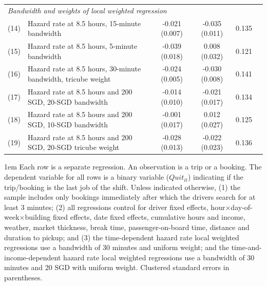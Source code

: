 \documentclass[reviewmode,AEJ]{AEA}
\begin{document}
\begin{appendices}
\begin{table}[]
\begin{tabularx}{\textwidth}{ll@{\extracolsep{\fill}}*{4}{c}}
    	\midrule
    	\multicolumn{5}{l}{\textit{Bandwidth and weights of local weighted regression}} \\
    	(14) & Hazard rate at 8.5 hours, 15-minute bandwidth & -0.021\sym{**} (0.007) & -0.035\sym{**} (0.011) & 0.135 \\
    	(15) & Hazard rate at 8.5 hours, 5-minute bandwidth & -0.039\sym{*} (0.018) & 0.008 (0.032) & 0.121 \\
    	(16) & Hazard rate at 8.5 hours, 30-minute bandwidth, tricube weight & -0.024\sym{***} (0.005) & -0.030\sym{***} (0.008) & 0.141 \\
    	(17) & Hazard rate at 8.5 hours and 200 SGD, 20-SGD bandwidth & -0.014 (0.010) & -0.021 (0.017) & 0.134 \\
    	(18) & Hazard rate at 8.5 hours and 200 SGD, 10-SGD bandwidth & -0.001 (0.017) & 0.012 (0.027) & 0.125 \\
    	(19) & Hazard rate at 8.5 hours and 200 SGD, 20-SGD tricube weight & -0.028\sym{*} (0.013) & -0.022 (0.023) & 0.136 \\
    	\bottomrule
    \end{tabularx}%
    \label{tb:immepickup}
	\begin{tablenotes}
		\parindent 1em%
		\small
	    Each row is a separate regression. An observation is a trip or a booking. The dependent variable for all rows is a binary variable ($Quit_{it}$) indicating if the trip/booking is the last job of the shift. Unless indicated otherwise, (1) the sample includes only bookings immediately after which the drivers search for at least 3 minutes; (2) all regressions control for driver fixed effects, hour\(\times\)day-of-week\(\times\)building fixed effects, date fixed effects,  cumulative hours and income, weather, market thickness, break time, passenger-on-board time, distance and duration to pickup; and (3) the time-dependent hazard rate local weighted regressions use a bandwidth of 30 minutes and uniform weight; and the time-and-income-dependent hazard rate local weighted regressions use a bandwidth of 30 minutes and 20 SGD with uniform weight. Clustered standard errors in parentheses.%
	\end{tablenotes}
    \label{tb:robustcheck}
\end{table}




\end{appendices}
\end{document}
